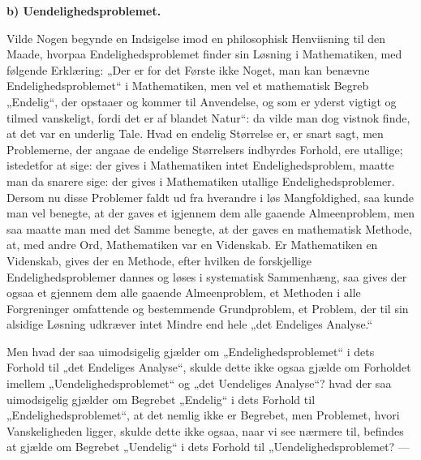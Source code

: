 \documentclass[12pt,a4paper]{book}
\begin{document}
\textbf{b) Uendelighedsproblemet.}

Vilde Nogen begynde en Indsigelse imod en philosophisk
Henviisning til den Maade, hvorpaa Endelighedsproblemet
finder sin Løsning i Mathematiken, med følgende Erklæring:
„Der er for det Første ikke Noget, man kan benævne Endelighedsproblemet“
i Mathematiken, men vel et mathematisk
Begreb „Endelig“, der opstaaer og kommer til Anvendelse,
og som er yderst vigtigt og tilmed vanskeligt, fordi det er af
blandet Natur“: da vilde man dog vistnok finde, at det var
en underlig Tale. Hvad en endelig Størrelse er, er snart
sagt, men Problemerne, der angaae de endelige Størrelsers
indbyrdes Forhold, ere utallige; istedetfor at sige: der gives
i Mathematiken intet Endelighedsproblem, maatte man da
snarere sige: der gives i Mathematiken utallige Endelighedsproblemer.
Dersom nu disse Problemer faldt ud fra hverandre
i løs Mangfoldighed, saa kunde man vel benegte, at
der gaves et igjennem dem alle gaaende Almeenproblem, men
saa maatte man med det Samme benegte, at der gaves en
mathematisk Methode, at, med andre Ord, Mathematiken var
en Videnskab. Er Mathematiken en Videnskab, gives der en
Methode, efter hvilken de forskjellige Endelighedsproblemer
dannes og løses i systematisk Sammenhæng, saa gives der
ogsaa et gjennem dem alle gaaende Almeenproblem, et Methoden
i alle Forgreninger omfattende og bestemmende Grundproblem,
et Problem, der til sin alsidige Løsning udkræver intet Mindre
end hele „det Endeliges Analyse.“

Men hvad der saa uimodsigelig gjælder om „Endelighedsproblemet“
i dets Forhold til „det Endeliges Analyse“, skulde
dette ikke ogsaa gjælde om Forholdet imellem „Uendelighedsproblemet“
og „det Uendeliges Analyse“? hvad der saa uimodsigelig
gjælder om Begrebet „Endelig“ i dets Forhold til
„Endelighedsproblemet“, at det nemlig ikke er Begrebet, men
Problemet, hvori Vanskeligheden ligger, skulde dette ikke ogsaa,
naar vi see nærmere til, befindes at gjælde om Begrebet
„Uendelig“ i dets Forhold til „Uendelighedsproblemet? ---
\end{document}
